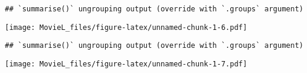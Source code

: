 \documentclass[
]{article}
\newenvironment{Shaded}{\begin{snugshade}}{\end{snugshade}}
\newcommand{\DataTypeTok}[1]{\textcolor[rgb]{0.13,0.29,0.53}{#1}}
\newcommand{\KeywordTok}[1]{\textcolor[rgb]{0.13,0.29,0.53}{\textbf{#1}}}
\newcommand{\NormalTok}[1]{#1}
\newcommand{\OperatorTok}[1]{\textcolor[rgb]{0.81,0.36,0.00}{\textbf{#1}}}
\newcommand{\OtherTok}[1]{\textcolor[rgb]{0.56,0.35,0.01}{#1}}
\newcommand{\StringTok}[1]{\textcolor[rgb]{0.31,0.60,0.02}{#1}}
\begin{document}
\begin{verbatim}
## `summarise()` ungrouping output (override with `.groups` argument)
\end{verbatim}

\texttt{[image: MovieL\_files/figure-latex/unnamed-chunk-1-6.pdf]}

\begin{Shaded}
\end{Shaded}

\begin{verbatim}
## `summarise()` ungrouping output (override with `.groups` argument)
\end{verbatim}

\texttt{[image: MovieL\_files/figure-latex/unnamed-chunk-1-7.pdf]}

\begin{Shaded}
\end{Shaded}
\end{document}
